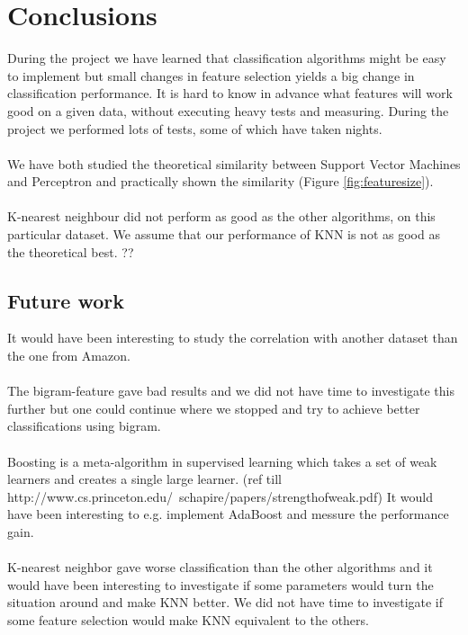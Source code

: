 \chapter{Conclusions}
During the project we have learned that classification algorithms might be easy to implement but small changes in feature selection yields a big change in classification performance. It is hard to know in advance what features will work good on a given data, without executing heavy tests and measuring. During the project we performed lots of tests, some of which have taken nights. 
\\\\
We have both studied the theoretical similarity between Support Vector Machines and Perceptron and practically shown the similarity (Figure \ref{fig:featuresize}).
\\\\
K-nearest neighbour did not perform as good as the other algorithms, on this particular dataset. We assume that our performance of KNN is not as good as the theoretical best. ??  
\section{Future work}
It would have been interesting to study the correlation with another dataset than the one from Amazon.  \\\\
The bigram-feature gave bad results and we did not have time to investigate this further but one could continue where we stopped and try to achieve better classifications using bigram. \\\\
Boosting is a meta-algorithm in supervised learning which takes a set of weak learners and creates a single large learner. (ref till http://www.cs.princeton.edu/~schapire/papers/strengthofweak.pdf) It would have been interesting to e.g. implement AdaBoost and messure the performance gain. \\\\
K-nearest neighbor gave worse classification than the other algorithms and it would have been interesting to investigate if some parameters would turn the situation around and make KNN better. We did not have time to investigate if some feature selection would make KNN equivalent to the others.
